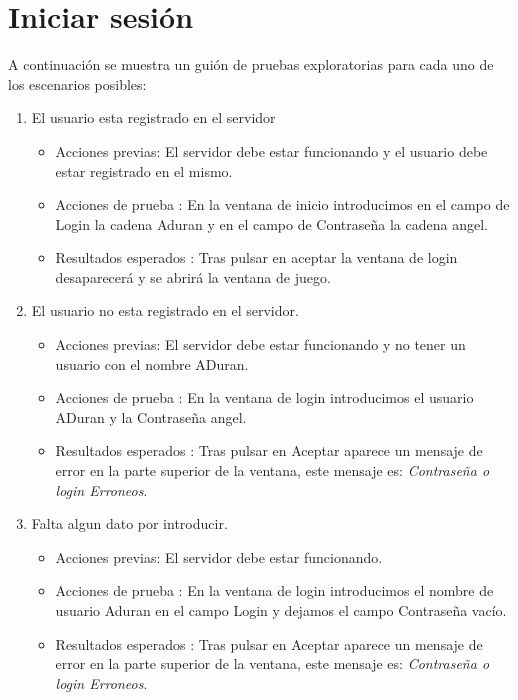  \section{Iniciar sesión}

A continuación se muestra un guión de pruebas exploratorias para cada uno de los escenarios posibles:
\begin{enumerate}
\item El usuario esta registrado en el servidor
	\begin{itemize}
	\item Acciones previas: El servidor debe estar funcionando y el usuario debe estar registrado en el mismo.
	\item Acciones de prueba : En la ventana de inicio introducimos en el campo de Login la cadena Aduran y en el campo de Contraseña la cadena angel.
	\item Resultados esperados : Tras pulsar en aceptar la ventana de login desaparecerá y se abrirá la ventana de juego.
	\end{itemize}
\item El usuario no esta registrado en el servidor.
	\begin{itemize}
	\item Acciones previas: El servidor debe estar funcionando y no tener un usuario con el nombre ADuran.
	\item Acciones de prueba : En la ventana de login introducimos el usuario ADuran y la Contraseña angel.
	\item Resultados esperados : Tras pulsar en Aceptar aparece un mensaje de error en la parte superior de la ventana, este mensaje es: \emph {Contraseña o login Erroneos}.
	\end{itemize}

\item Falta algun dato por introducir.
	\begin{itemize}
	\item Acciones previas: El servidor debe estar funcionando.
	\item Acciones de prueba : En la ventana de login introducimos el nombre de usuario Aduran en el campo Login y dejamos el campo Contraseña vacío.
	\item Resultados esperados : Tras pulsar en Aceptar aparece un mensaje de error en la parte superior de la ventana, este mensaje es: \emph {Contraseña o login Erroneos}.
	\end{itemize}
\end{enumerate}

